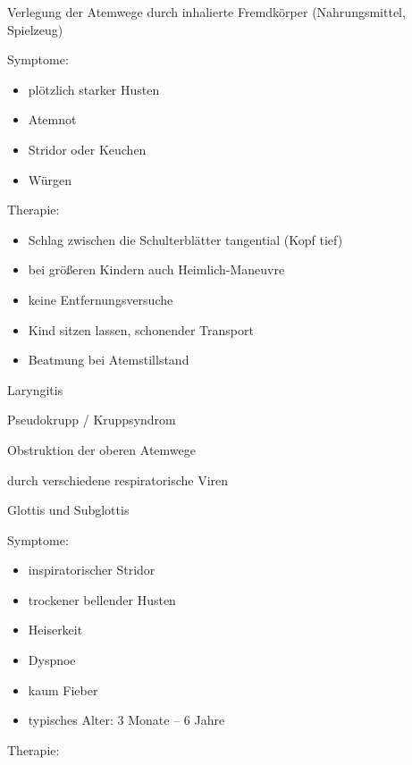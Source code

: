 \documentclass{article}
\begin{document}
Verlegung der Atemwege durch  inhalierte Fremdk\"orper (Nahrungsmittel, 
Spielzeug)

Symptome:

\begin{itemize}
\item pl\"otzlich starker Husten

\item Atemnot

\item Stridor oder Keuchen

\item W\"urgen

\end{itemize}
Therapie:

\begin{itemize}
\item Schlag zwischen die Schulterbl\"atter tangential  (Kopf tief)

\item bei gr\"o{\ss}eren Kindern auch Heimlich-Maneuvre

\item keine Entfernungsversuche

\item Kind sitzen lassen, schonender Transport

\item Beatmung bei Atemstillstand

\end{itemize}
Laryngitis

Pseudokrupp / Kruppsyndrom

Obstruktion der oberen Atemwege

durch verschiedene respiratorische Viren

Glottis und Subglottis

Symptome:

\begin{itemize}
\item inspiratorischer  Stridor

\item trockener bellender Husten

\item Heiserkeit

\item Dyspnoe

\item kaum Fieber

\item typisches Alter: 3 Monate -- 6 Jahre

\end{itemize}
Therapie:
\end{document}
